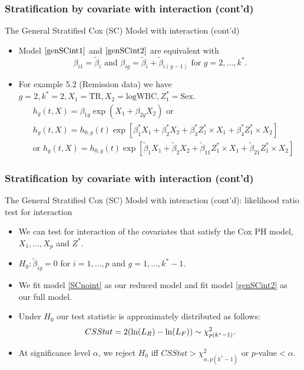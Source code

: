 \documentclass{beamer}
\theoremstyle{definition}
\begin{document}
\begin{frame}
\frametitle{Stratification by covariate with interaction (cont'd)}
\begin{block}{The General Stratified Cox (SC) Model with interaction (cont'd)}
\begin{itemize}
\item Model $\ref{genSCint1}$ and $\ref{genSCint2}$ are equivalent with
\[ \beta_{i1} = \tilde{\beta}_i \text{ and } \beta_{ig} = \tilde{\beta}_{i} + \tilde{\beta}_{i(g-1)} \text{ for } g=2,\ldots,k^*.
\]
\item For example 5.2 (Remission data) we have $g=2, k^*=2, X_1=\text{TR}, X_2=\text{logWBC}, Z_1^*=\text{Sex}$.
\begin{align*}
&h_g(t,X) = \beta_{1g} \exp( X_1 + \beta_{2g} X_2)  \text{ or } \\
&h_g(t,X) = h_{0,g}(t)\exp[\beta_1^*X_1  + \beta_2^*X_2 + \beta_3^*Z_1^*\times X_1 + \beta_4^*Z_1^*\times X_2 ]  \\
&\text{or } h_g(t,X) = h_{0,g}(t)\exp[\tilde{\beta}_1X_1  + \tilde{\beta}_2X_2 + \tilde{\beta}_{11}Z_1^*\times X_1 + \tilde{\beta}_{21}Z_1^*\times X_2 ]
\end{align*}
\end{itemize}
\end{block}
\end{frame}

\begin{frame}
\frametitle{Stratification by covariate with interaction (cont'd)}
\begin{block}{The General Stratified Cox (SC) Model with interaction (cont'd): likelihood ratio test for interaction}
\begin{itemize}
\item We can test for interaction of the covariates that satisfy the Cox PH model, $X_1,\ldots,X_p$ and $Z^*$.
\item $H_0: \tilde{\beta}_{ig} =0$ for $i=1,\ldots,p$ and $g=1,\ldots,k^*-1$.
\item We fit model \ref{SCnoint} as our reduced model and fit model \ref{genSCint2} as our full model.
\item Under $H_0$ our test statistic is approximately distributed as follows:
\[
CSStat= \-2(\ln(L_R) - \ln(L_F)) \sim \chi^2_{p(k^*-1)}.
\]
\item At significance level $\alpha$, we reject $H_0$  iff $CSStat>\chi^2_{\alpha,p(k^*-1)}$ or $p$-value$<\alpha$.
\end{itemize}
\end{block}
\end{frame}
\end{document}
